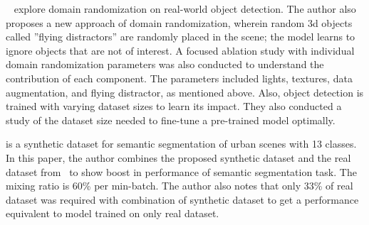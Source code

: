 ~\cite{Tremblay2018TrainingDN}  explore domain randomization on real-world object detection.
The author also proposes a new approach of domain randomization, wherein random 3d objects called ”flying distractors” are randomly placed in the scene;
the model learns to ignore objects that are not of interest.
A focused ablation study with individual domain randomization parameters was also conducted to understand the contribution of each component.
The parameters included lights, textures, data augmentation, and flying distractor, as mentioned above.
Also, object detection is trained with varying dataset sizes to learn its impact.
They also conducted a study of the dataset size needed to fine-tune a pre-trained model optimally.

\cite{synthia} is a synthetic dataset for semantic segmentation of urban scenes with 13 classes.
In this paper, the author combines the proposed synthetic dataset and the real dataset from~\cite{Geiger2012CVPR,Russell2008,BrostowSFC:ECCV08} to show boost in performance of semantic segmentation task.
The mixing ratio is 60\% per min-batch.
The author also notes that only 33\% of real dataset was required with combination of synthetic dataset to get a performance equivalent to model trained on only real dataset.

